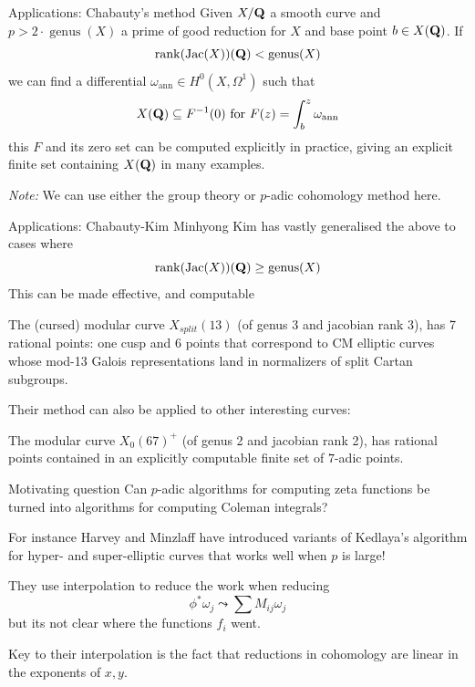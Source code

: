 \begin{frame}{Applications: Chabauty's method}
    Given $X/\mathbf Q$ a smooth curve and $p> 2\cdot\operatorname{genus}(X)$ a prime of good reduction for $X$ and base point $b \in X(\mathbf Q)$.
    If
    \[ \operatorname{rank}(\operatorname{Jac}(X))(\mathbf Q) < \operatorname{genus}(X) \]
    we can find a differential $\omega _{\text{ann}}\in H^0(X, \Omega ^1)$ such that
    \[
        X(\mathbf Q) \subseteq F^{-1}(0) \text{ for } F(z) = \int_b^z \omega_{\text{ann}}
    \]\pause
    this $F$ and its zero set can be computed explicitly in practice, giving an explicit finite set containing $X(\mathbf Q)$ in many examples.\pause

    \emph{Note:} We can use either the group theory or $p$-adic cohomology method here.

\end{frame}

\begin{frame}{Applications: Chabauty-Kim}
    Minhyong Kim has vastly generalised the above to cases where
    \[ \operatorname{rank}(\operatorname{Jac}(X))(\mathbf Q) \ge \operatorname{genus}(X)\]\pause
    This can be made effective, and computable
    \begin{theorem}
        The (cursed) modular curve \(X_{split}(13)\) (of genus 3 and jacobian rank 3),
        has 7 rational points: one cusp and 6 points that correspond to CM elliptic curves whose mod-13 Galois representations land in normalizers of split Cartan subgroups.
    \end{theorem}\pause

    Their method can also be applied to other interesting curves:

    \begin{theorem}
        The modular curve \(X_{0}(67)^+\) (of genus 2 and jacobian rank 2),
        has rational points contained in an explicitly computable finite set of $7$-adic points.
    \end{theorem}
\end{frame}

\begin{frame}{Motivating question}
    Can $p$-adic algorithms for computing zeta functions be turned into algorithms for computing Coleman integrals? \pause

    For instance Harvey and Minzlaff have introduced variants of Kedlaya's algorithm for hyper- and super-elliptic curves that works well when $p$ is large!\pause

    They use interpolation to reduce the work when reducing
    \[\phi^* \omega_j \leadsto \sum M_{ij} \omega_j\]
    but its not clear where the functions $f_i$ went.

    Key to their interpolation is the fact that reductions in cohomology are linear in the exponents of $x,y$.



\end{frame}



